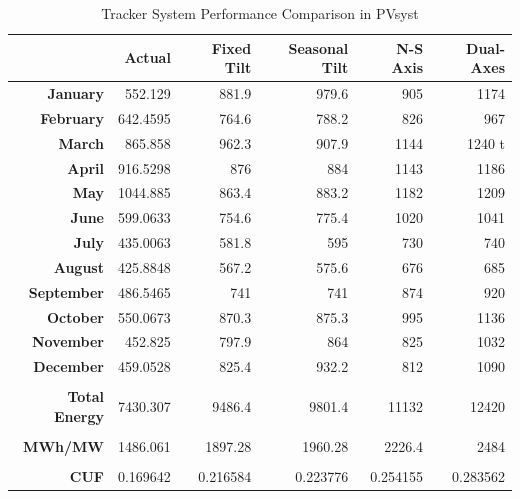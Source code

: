 \begin{table}[H]
  \centering
     \caption{Tracker System Performance Comparison in PVsyst}
    \begin{tabular}{|r|r|r|r|r|r|}
    \hline
    \textbf{} & \textbf{Actual} & \textbf{Fixed Tilt} & \textbf{Seasonal Tilt} & \textbf{N-S Axis} & \textbf{Dual-Axes} \\
    \hline
    \textbf{January} & 552.129 & 881.9 & 979.6 & 905   & 1174 \\
    \hline
    \textbf{February} & 642.4595 & 764.6 & 788.2 & 826   & 967 \\
    \hline
    \textbf{March} & 865.858 & 962.3 & 907.9 & 1144  & 1240 t\\
    \hline
    \textbf{April} & 916.5298 & 876   & 884   & 1143  & 1186 \\
    \hline
    \textbf{May} & 1044.885 & 863.4 & 883.2 & 1182  & 1209 \\
    \hline
    \textbf{June} & 599.0633 & 754.6 & 775.4 & 1020  & 1041 \\
    \hline
    \textbf{July} & 435.0063 & 581.8 & 595   & 730   & 740 \\
    \hline
    \textbf{August} & 425.8848 & 567.2 & 575.6 & 676   & 685 \\
    \hline
    \textbf{September} & 486.5465 & 741   & 741   & 874   & 920 \\
    \hline
    \textbf{October} & 550.0673 & 870.3 & 875.3 & 995   & 1136 \\
    \hline
    \textbf{November} & 452.825 & 797.9 & 864   & 825   & 1032 \\
    \hline
    \textbf{December} & 459.0528 & 825.4 & 932.2 & 812   & 1090 \\
    \hline
          &       &       &       &       &  \\
    \hline
    \textbf{Total Energy} & 7430.307 & 9486.4 & 9801.4 & 11132 & 12420 \\
    \hline
    \textbf{} &       &       &       &       &  \\
    \hline
    \textbf{MWh/MW} & 1486.061 & 1897.28 & 1960.28 & 2226.4 & 2484 \\
    \hline
          &       &       &       &       &  \\
    \hline
    \textbf{CUF} & 0.169642 & 0.216584 & 0.223776 & 0.254155 & 0.283562 \\
    \hline
    \end{tabular}%
 
    \label{tabc2h5}%
\end{table}

